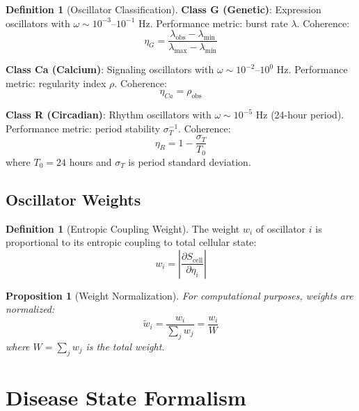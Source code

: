 \documentclass[10pt,twocolumn]{article}
\theoremstyle{plain}
\newtheorem{proposition}[theorem]{Proposition}
\theoremstyle{definition}
\newtheorem{definition}[theorem]{Definition}
\theoremstyle{remark}
\begin{document}
\begin{definition}[Oscillator Classification]
\textbf{Class G (Genetic)}: Expression oscillators with $\omega \sim 10^{-3}$--$10^{-1}$ Hz. Performance metric: burst rate $\lambda$. Coherence:
\begin{equation}
\eta_G = \frac{\lambda_{\mathrm{obs}} - \lambda_{\min}}{\lambda_{\max} - \lambda_{\min}}
\end{equation}

\textbf{Class Ca (Calcium)}: Signaling oscillators with $\omega \sim 10^{-2}$--$10^{0}$ Hz. Performance metric: regularity index $\rho$. Coherence:
\begin{equation}
\eta_{Ca} = \rho_{\mathrm{obs}}
\end{equation}

\textbf{Class R (Circadian)}: Rhythm oscillators with $\omega \sim 10^{-5}$ Hz (24-hour period). Performance metric: period stability $\sigma_T^{-1}$. Coherence:
\begin{equation}
\eta_R = 1 - \frac{\sigma_T}{T_0}
\end{equation}
where $T_0 = 24$ hours and $\sigma_T$ is period standard deviation.
\end{definition}

\subsection{Oscillator Weights}

\begin{definition}[Entropic Coupling Weight]
\label{def:weight}
The weight $w_i$ of oscillator $i$ is proportional to its entropic coupling to total cellular state:
\begin{equation}
w_i = \left|\frac{\partial S_{\mathrm{cell}}}{\partial \eta_i}\right|
\label{eq:weight}
\end{equation}
\end{definition}

\begin{proposition}[Weight Normalization]
\label{prop:weight_norm}
For computational purposes, weights are normalized:
\begin{equation}
\tilde{w}_i = \frac{w_i}{\sum_j w_j} = \frac{w_i}{W}
\end{equation}
where $W = \sum_j w_j$ is the total weight.
\end{proposition}

\section{Disease State Formalism}
\label{sec:disease}
\end{document}
